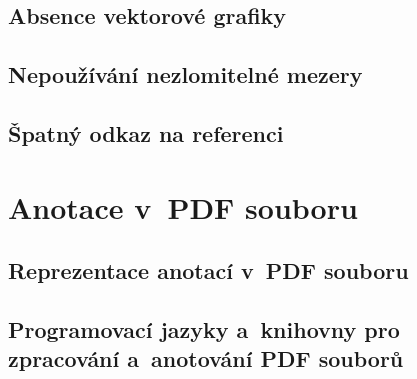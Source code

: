 \section{Absence vektorové grafiky}
\dummyShortText[10]


\section{Nepoužívání nezlomitelné mezery}
\dummyText
{}

\section{Špatný odkaz na referenci}
\dummyText
{}






\chapter{Anotace v~PDF souboru}

\dummyText


\section{Reprezentace anotací v~PDF souboru}

\DummyText


\section{Programovací jazyky a~knihovny pro zpracování a~anotování PDF souborů}

